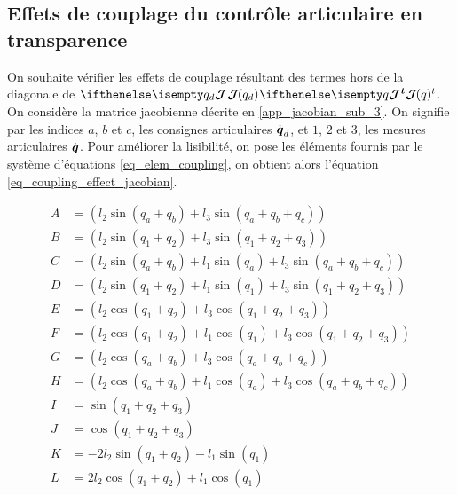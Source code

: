 \begin{appendices}
	\newpage
	\section{Effets de couplage du contrôle articulaire en transparence} \label{app_coupling_effect}
	
	On souhaite vérifier les effets de couplage résultant des termes hors de la diagonale de  $ \jacobian{q_d}{}{} \jacobian{q}{}{t} $. On considère la matrice jacobienne décrite en \cref{app_jacobian_sub_3}. On signifie par les indices $ a $, $ b $ et $ c $, les consignes articulaires $ \dot{\vect{q}}_d $, et $ 1 $, $ 2 $ et $ 3 $, les mesures articulaires $ \dot{\vect{q}} $. Pour améliorer la lisibilité, on pose les éléments fournis par le système d'équations \cref{eq_elem_coupling}, on obtient alors l'équation \cref{eq_coupling_effect_jacobian}.
	
	\begin{equation} \label{eq_elem_coupling}
		\begin{split}
			A &= (l_2 \sin(q_a + q_b) + l_3 \sin(q_a + q_b + q_c)) \\
			B &= (l_2 \sin(q_1 + q_2) + l_3 \sin(q_1 + q_2 + q_3)) \\
			C &= (l_2 \sin(q_a + q_b) + l_1 \sin(q_a) + l_3 \sin(q_a + q_b + q_c)) \\
			D &= (l_2 \sin(q_1 + q_2) + l_1 \sin(q_1) + l_3 \sin(q_1 + q_2 + q_3)) \\
			E &= (l_2 \cos(q_1 + q_2) + l_3 \cos(q_1 + q_2 + q_3)) \\
			F &= (l_2 \cos(q_1 + q_2) + l_1 \cos(q_1) + l_3 \cos(q_1 + q_2 + q_3)) \\
			G &= (l_2 \cos(q_a + q_b) + l_3 \cos(q_a + q_b + q_c)) \\
			H &= (l_2 \cos(q_a + q_b) + l_1 \cos(q_a) + l_3 \cos(q_a + q_b + q_c)) \\
			I &= \sin(q_1 + q_2 + q_3) \\
			J &= \cos(q_1 + q_2 + q_3) \\
			K &= -2 l_2 \sin(q_1 + q_2) - l_1 \sin(q_1) \\
			L &=  2 l_2 \cos(q_1 + q_2) + l_1 \cos(q_1) \\
		\end{split}
	\end{equation}
	

\end{appendices}
